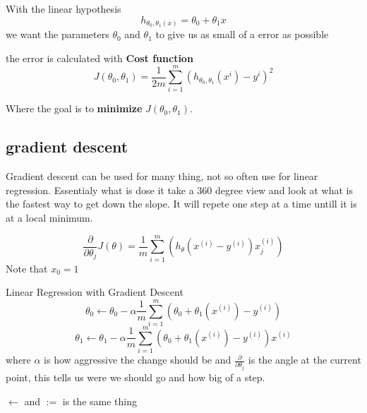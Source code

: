 \documentclass{article}
\begin{document}
With the linear hypothesis
\begin{equation*}
    h_{\theta_0,\theta_1(x)} = \theta_0 + \theta_1 x
\end{equation*}
we want the parameters $\theta_0$ and $\theta_1$ to give us as small of a error as possible

the error is calculated with \textbf{Cost function} 
\begin{equation*}
    J(\theta_0,\theta_1) = \frac{1}{2m}\sum_{i=1}^{m}(h_{\theta_0,\theta_1}(x^i)-y^i)^2
\end{equation*}

Where the goal is to \textbf{minimize} $J(\theta_0,\theta_1)$.

\subsection{gradient descent}

Gradient descent can be used for many thing, not so often use for linear regression.
Essentialy what is dose it take a 360 degree view and look at what is the fastest way
to get down the slope. It will repete one step at a time untill it is at a local minimum.

\begin{equation*}
    \frac{\partial}{\partial\theta_j}J(\theta) = \frac{1}{m}\sum_{i=1}^m \left( h_{\theta}(x^{(i)} -y^{(i)})x_j^{(i)} \right)
\end{equation*}
Note that $x_0=1$


\begin{definitionblock}{Linear Regression with Gradient Descent}
    \begin{equation*}
        \theta_0 \gets \theta_0 - \alpha\frac{1}{m}\sum_{i=1}^{m}(\theta_0 + \theta_1(x^{(i)}) - y^{(i)})
    \end{equation*} 
    \begin{equation*}
        \theta_1 \gets \theta_1 - \alpha\frac{1}{m}\sum_{i=1}^{m}(\theta_0 + \theta_1(x^{(i)}) - y^{(i)}) x^{(i)}
    \end{equation*} 
    where $\alpha$ is how aggressive the change should be and $\frac{\partial}{\partial\theta_j}$
    is the angle at the current point, this tells us were we should go and how big of a step.
\end{definitionblock}
$\gets$ and $:=$ is the same thing
\end{document}
